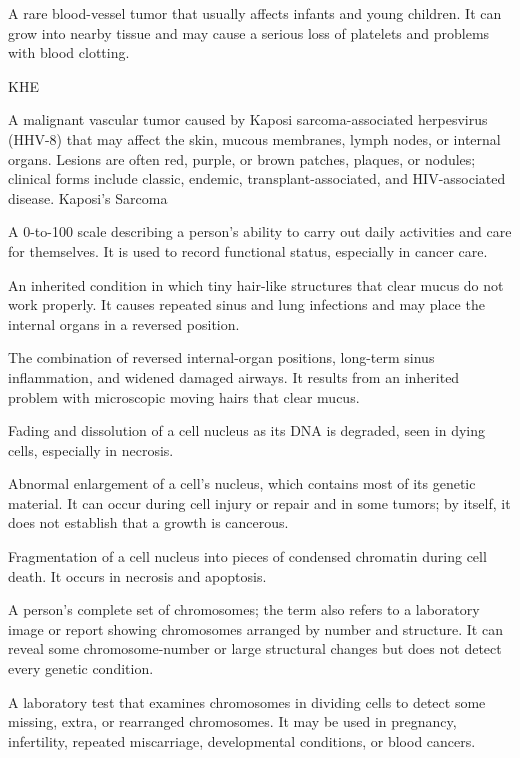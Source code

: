  A rare blood-vessel tumor that usually affects infants and young children. It can grow into nearby tissue and may cause a serious loss of platelets and problems with blood clotting.

\synonyms
KHE

 A malignant vascular tumor caused by Kaposi sarcoma-associated herpesvirus (HHV-8) that may affect the skin, mucous membranes, lymph nodes, or internal organs. Lesions are often red, purple, or brown patches, plaques, or nodules; clinical forms include classic, endemic, transplant-associated, and HIV-associated disease.
\synonyms
Kaposi's Sarcoma

 A 0-to-100 scale describing a person's ability to carry out daily activities and care for themselves. It is used to record functional status, especially in cancer care.

 An inherited condition in which tiny hair-like structures that clear mucus do not work properly. It causes repeated sinus and lung infections and may place the internal organs in a reversed position.

 The combination of reversed internal-organ positions, long-term sinus inflammation, and widened damaged airways. It results from an inherited problem with microscopic moving hairs that clear mucus.

 Fading and dissolution of a cell nucleus as its DNA is degraded, seen in dying cells, especially in necrosis.

 Abnormal enlargement of a cell's nucleus, which contains most of its genetic material. It can occur during cell injury or repair and in some tumors; by itself, it does not establish that a growth is cancerous.

 Fragmentation of a cell nucleus into pieces of condensed chromatin during cell death. It occurs in necrosis and apoptosis.

 A person's complete set of chromosomes; the term also refers to a laboratory image or report showing chromosomes arranged by number and structure. It can reveal some chromosome-number or large structural changes but does not detect every genetic condition.

 A laboratory test that examines chromosomes in dividing cells to detect some missing, extra, or rearranged chromosomes. It may be used in pregnancy, infertility, repeated miscarriage, developmental conditions, or blood cancers.

